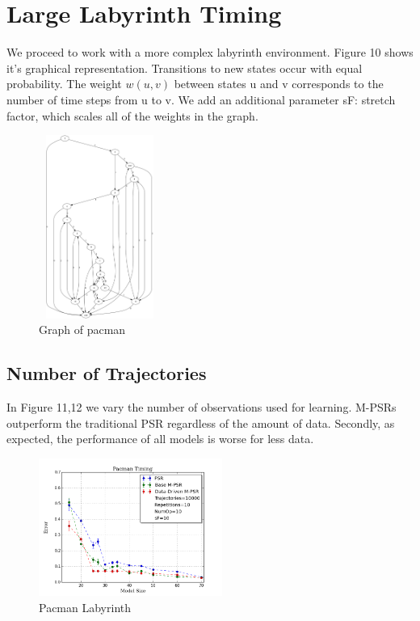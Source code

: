 \section{Large Labyrinth Timing}

We proceed to work with a more complex labyrinth environment. Figure 10 shows it's graphical representation. Transitions to new states occur with equal probability. The weight $w(u,v)$ between states u and v corresponds to the number of time steps from u to v. We add an additional parameter sF: stretch factor, which scales all of the weights in the graph. 

\begin{figure}[ht!]
\centering
\includegraphics[width=40mm,height=60mm]{uCOREPICS/Pacman/graphPacMan.png}
\caption{Graph of pacman\label{overflow}}
\end{figure}

\subsection{Number of Trajectories}

In Figure 11,12 we vary the number of observations used for learning. M-PSRs outperform the traditional PSR regardless of the amount of data. Secondly, as expected, the performance of all models is worse for less data.

\begin{figure}[ht!]
\centering
\includegraphics[width=60mm]{uCOREPICS/Pacman/Pacman10k.png}
\caption{Pacman Labyrinth\label{overflow}}
\end{figure}


